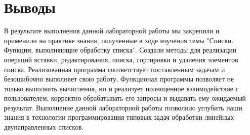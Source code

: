 \section*{Выводы}

В результате выполнения данной лабораторной работы мы закрепили и применили на практике знания,
полученные в ходе изучения темы
"Списки.
Функции, выполняющие обработку списка".
Создали методы для реализации операций вставки,
редактирования, поиска, сортировки и удаления элементов cписка.
Реализованная программа соответствует поставленным задачам и безошибочно выполняет свою работу.
Функционал программы позволяет не только выполнять вычисления, но и реализует полноценное взаимодействие
с пользователем, корректно обрабатывать его запросы и выдавать ему
ожидаемый результат.
Выполнение данной лабораторной работы позволило
углубить наши знания в технологии программирования типовых
задач обработки линейных
двунаправленных списков.
